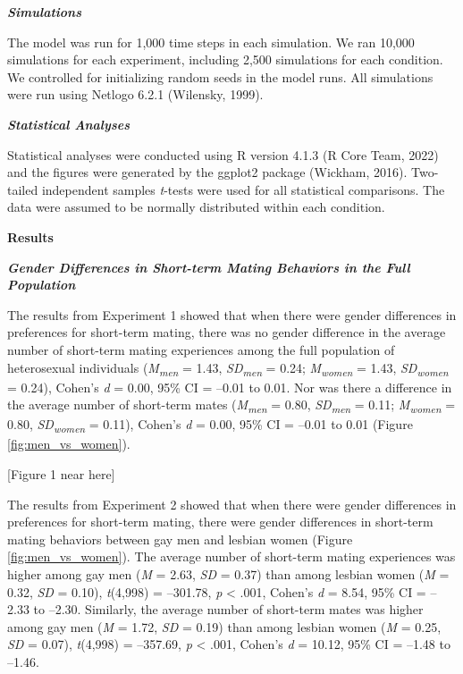 \documentclass[
  12pt,
]{article}
\begin{document}
\textbf{\emph{Simulations}}

The model was run for 1,000 time steps in each simulation. We ran 10,000
simulations for each experiment, including 2,500 simulations for each
condition. We controlled for initializing random seeds in the model
runs. All simulations were run using Netlogo 6.2.1 (Wilensky, 1999).

\textbf{\emph{Statistical Analyses}}

Statistical analyses were conducted using R version 4.1.3 (R Core Team,
2022) and the figures were generated by the ggplot2 package (Wickham,
2016). Two-tailed independent samples \emph{t}-tests were used for all
statistical comparisons. The data were assumed to be normally
distributed within each condition.

\vspace{5mm}

\textbf{Results}

\textbf{\emph{Gender Differences in Short-term Mating Behaviors in the
Full Population}}

The results from Experiment 1 showed that when there were gender
differences in preferences for short-term mating, there was no gender
difference in the average number of short-term mating experiences among
the full population of heterosexual individuals
(\emph{M\textsubscript{men}} = 1.43, \emph{SD\textsubscript{men}} =
0.24; \emph{M\textsubscript{women}} = 1.43,
\emph{SD\textsubscript{women}} = 0.24), Cohen's \emph{d} = 0.00, 95\% CI
= --0.01 to 0.01. Nor was there a difference in the average number of
short-term mates (\emph{M\textsubscript{men}} = 0.80,
\emph{SD\textsubscript{men}} = 0.11; \emph{M\textsubscript{women}} =
0.80, \emph{SD\textsubscript{women}} = 0.11), Cohen's \emph{d} = 0.00,
95\% CI = --0.01 to 0.01 (Figure \ref{fig:men_vs_women}).

{[}Figure 1 near here{]}

The results from Experiment 2 showed that when there were gender
differences in preferences for short-term mating, there were gender
differences in short-term mating behaviors between gay men and lesbian
women (Figure \ref{fig:men_vs_women}). The average number of short-term
mating experiences was higher among gay men (\emph{M} = 2.63, \emph{SD}
= 0.37) than among lesbian women (\emph{M} = 0.32, \emph{SD} = 0.10),
\emph{t}(4,998) = --301.78, \emph{p} \textless{} .001, Cohen's \emph{d}
= 8.54, 95\% CI = --2.33 to --2.30. Similarly, the average number of
short-term mates was higher among gay men (\emph{M} = 1.72, \emph{SD} =
0.19) than among lesbian women (\emph{M} = 0.25, \emph{SD} = 0.07),
\emph{t}(4,998) = --357.69, \emph{p} \textless{} .001, Cohen's \emph{d}
= 10.12, 95\% CI = --1.48 to --1.46.
\end{document}
